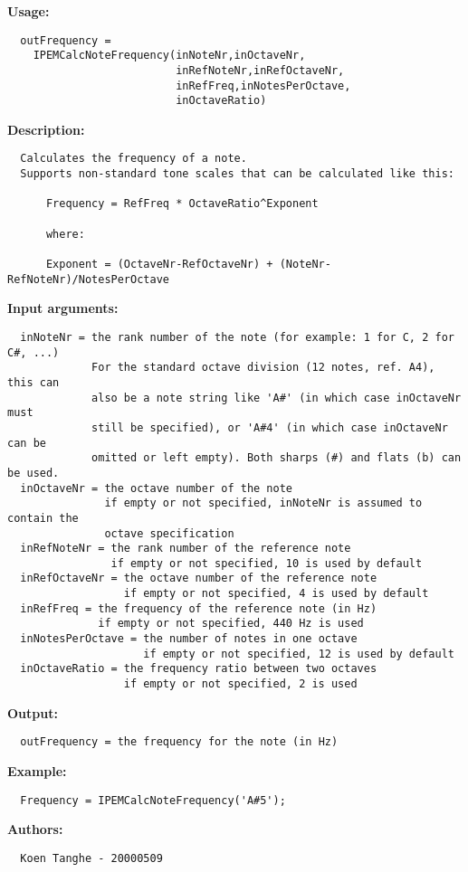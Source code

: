 \textbf{Usage:}
\begin{verbatim}  outFrequency = 
    IPEMCalcNoteFrequency(inNoteNr,inOctaveNr,
                          inRefNoteNr,inRefOctaveNr,
                          inRefFreq,inNotesPerOctave,
                          inOctaveRatio)

\end{verbatim}
\textbf{Description:}
\begin{verbatim}  Calculates the frequency of a note.
  Supports non-standard tone scales that can be calculated like this:

      Frequency = RefFreq * OctaveRatio^Exponent

      where:

      Exponent = (OctaveNr-RefOctaveNr) + (NoteNr-RefNoteNr)/NotesPerOctave 

\end{verbatim}
\textbf{Input arguments:}
\begin{verbatim}  inNoteNr = the rank number of the note (for example: 1 for C, 2 for C#, ...)
             For the standard octave division (12 notes, ref. A4), this can
             also be a note string like 'A#' (in which case inOctaveNr must
             still be specified), or 'A#4' (in which case inOctaveNr can be
             omitted or left empty). Both sharps (#) and flats (b) can be used.
  inOctaveNr = the octave number of the note
               if empty or not specified, inNoteNr is assumed to contain the
               octave specification 
  inRefNoteNr = the rank number of the reference note
                if empty or not specified, 10 is used by default
  inRefOctaveNr = the octave number of the reference note
                  if empty or not specified, 4 is used by default
  inRefFreq = the frequency of the reference note (in Hz)
              if empty or not specified, 440 Hz is used
  inNotesPerOctave = the number of notes in one octave
                     if empty or not specified, 12 is used by default
  inOctaveRatio = the frequency ratio between two octaves
                  if empty or not specified, 2 is used

\end{verbatim}
\textbf{Output:}
\begin{verbatim}  outFrequency = the frequency for the note (in Hz)

\end{verbatim}
\textbf{Example:}
\begin{verbatim}  Frequency = IPEMCalcNoteFrequency('A#5');

\end{verbatim}
\textbf{Authors:}
\begin{verbatim}  Koen Tanghe - 20000509
\end{verbatim}


